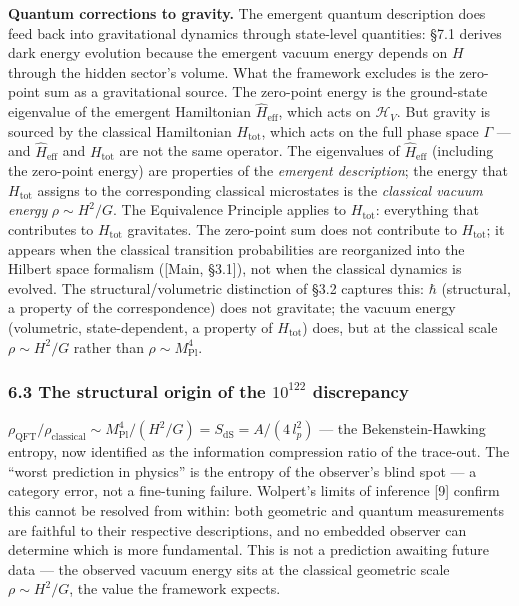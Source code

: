 \documentclass[
]{article}
\begin{document}
\textbf{Quantum corrections to gravity.} The emergent quantum
description does feed back into gravitational dynamics through
state-level quantities: §7.1 derives dark energy evolution because the
emergent vacuum energy depends on \(H\) through the hidden sector's
volume. What the framework excludes is the zero-point sum as a
gravitational source. The zero-point energy is the ground-state
eigenvalue of the emergent Hamiltonian \(\hat{H}_{\text{eff}}\), which
acts on \(\mathcal{H}_V\). But gravity is sourced by the classical
Hamiltonian \(H_{\text{tot}}\), which acts on the full phase space
\(\Gamma\) --- and \(\hat{H}_{\text{eff}}\) and \(H_{\text{tot}}\) are
not the same operator. The eigenvalues of \(\hat{H}_{\text{eff}}\)
(including the zero-point energy) are properties of the \emph{emergent
description}; the energy that \(H_{\text{tot}}\) assigns to the
corresponding classical microstates is the \emph{classical vacuum
energy} \(\rho \sim H^2/G\). The Equivalence Principle applies to
\(H_{\text{tot}}\): everything that contributes to \(H_{\text{tot}}\)
gravitates. The zero-point sum does not contribute to
\(H_{\text{tot}}\); it appears when the classical transition
probabilities are reorganized into the Hilbert space formalism ({[}Main,
§3.1{]}), not when the classical dynamics is evolved. The
structural/volumetric distinction of §3.2 captures this: \(\hbar\)
(structural, a property of the correspondence) does not gravitate; the
vacuum energy (volumetric, state-dependent, a property of
\(H_{\text{tot}}\)) does, but at the classical scale \(\rho \sim H^2/G\)
rather than \(\rho \sim M_{\text{Pl}}^4\).

\hypertarget{the-structural-origin-of-the-10122-discrepancy}{%
\subsubsection{\texorpdfstring{6.3 The structural origin of the
\(10^{122}\)
discrepancy}{6.3 The structural origin of the 10\^{}\{122\} discrepancy}}\label{the-structural-origin-of-the-10122-discrepancy}}

\(\rho_{\text{QFT}} / \rho_{\text{classical}} \sim M_{\text{Pl}}^4 / (H^2/G) = S_{\text{dS}} = A/(4\,l_p^2)\)
--- the Bekenstein-Hawking entropy, now identified as the information
compression ratio of the trace-out. The ``worst prediction in physics''
is the entropy of the observer's blind spot --- a category error, not a
fine-tuning failure. Wolpert's limits of inference {[}9{]} confirm this
cannot be resolved from within: both geometric and quantum measurements
are faithful to their respective descriptions, and no embedded observer
can determine which is more fundamental. This is not a prediction
awaiting future data --- the observed vacuum energy sits at the
classical geometric scale \(\rho \sim H^2/G\), the value the framework
expects.
\end{document}

